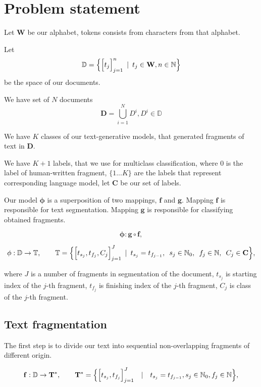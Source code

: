 \documentclass{article}
\newcommand{\Hquad}{\hspace{0.5em}}
\begin{document}
\section{Problem statement}

Let $\mathbf{W}$ be our alphabet, tokens consists from characters from that alphabet.

Let $$\mathbb{D} = \Bigl\{\Big[t_j\Big]_{j=1}^n \Hquad|\Hquad t_j \in \mathbf{W}, n \in \mathbb{N}\Bigr\}$$ be the space of our documents.

We have set of $N$ documents
$$\mathbf{D} = \bigcup_{i=1}^{N}D^i, D^i \in \mathbb{D}$$

We have $K$ classes of our text-generative models, that generated fragments of text in $\mathbf{D}$.

We have $K + 1$ labels, that we use for multiclass classification, where $0$ is the label of human-written fragment, $\{1...K\}$ are the  labels that represent corresponding language model, let $\mathbf{C}$ be our set of labels.

Our model $\mathbf{\phi}$ is a superposition of two mappings, $\mathbf{f}$ and $\mathbf{g}$. Mapping $\mathbf{f}$ is responsible for text segmentation. Mapping $\mathbf{g}$ is responsible for classifying obtained fragments.

$$\mathbf{\phi} : \mathbf{g} \circ \mathbf{f},$$


$$\mathbf{\phi}: \mathbb{D} \rightarrow \mathbb{T}, \qquad \mathbb{T} = \Bigl\{\Big[t_{s_j}, t_{f_j}, C_j\Big]_{j = 1}^{J} \Hquad|\Hquad t_{s_j} = t_{f_{j - 1}},\Hquad s_j \in \mathbb{N}_0,\Hquad f_j \in \mathbb{N}, \Hquad C_j \in \mathbf{C}\Bigr\},$$

where $J$ is a number of fragments in segmentation of the document, $t_{s_j}$ is starting index of the $j$-th fragment,  $t_{f_j}$ is finishing index of the $j$-th fragment,  $C_{j}$ is class of the $j$-th fragment.



\subsection{Text fragmentation}
The first step is to divide our text into sequential non-overlapping fragments of different origin.

$$\mathbf{f}: \mathbb{D} \rightarrow \mathbf{T}^*, \qquad \mathbf{T}^* = \Bigl\{\Big[t_{s_j}, t_{f_j}\Big]_{j = 1}^{J}\quad|\quad t_{s_j} = t_{f_{j - 1}}, s_j \in \mathbb{N}_0, f_j \in \mathbb{N}\Bigr\},$$
\end{document}
